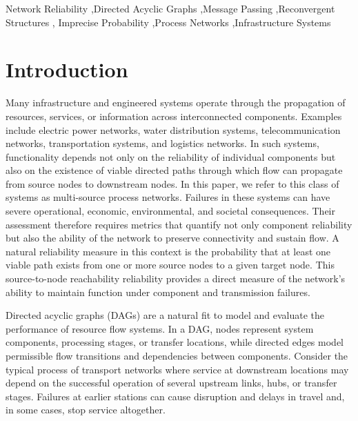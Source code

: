 \documentclass[preprint,12pt]{elsarticle}
\theoremstyle{definition}
\begin{document}
\begin{frontmatter}
\begin{keyword}
Network Reliability \sep Directed Acyclic Graphs \sep Message Passing \sep Reconvergent Structures \sep
Imprecise Probability \sep Process Networks \sep Infrastructure Systems
\end{keyword}

\end{frontmatter}

\section{Introduction}\label{sec:intro}

Many infrastructure and engineered systems operate through the propagation of resources, services, or
information across interconnected components. Examples include electric power networks, water
distribution systems, telecommunication networks, transportation systems, and logistics networks. In such
systems, functionality depends not only on the reliability of individual components but also on the
existence of viable directed paths through which flow can propagate from source nodes to downstream
nodes. In this paper, we refer to this class of systems as multi-source process networks. Failures in
these systems can have severe operational, economic, environmental, and societal consequences. Their
assessment therefore requires metrics that quantify not only component reliability but also the ability
of the network to preserve connectivity and sustain flow. A natural reliability measure in this context
is the probability that at least one viable path exists from one or more source nodes to a given target
node. This source-to-node reachability reliability provides a direct measure of the network's ability to
maintain function under component and transmission failures.

Directed acyclic graphs (DAGs) are a natural fit to model and evaluate the performance of resource flow
systems. In a DAG, nodes represent system components, processing stages, or transfer locations, while
directed edges model permissible flow transitions and dependencies between components. Consider the
typical process of transport networks where service at downstream locations may depend on the successful
operation of several upstream links, hubs, or transfer stages. Failures at earlier stations can cause
disruption and delays in travel and, in some cases, stop service altogether.
\end{document}
